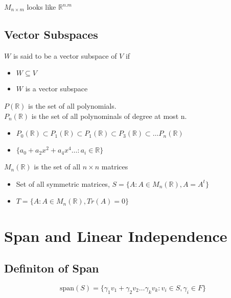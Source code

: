 \documentclass[11pt,a4paper]{colorart}
\def\l{\left}
\def\r{\right}
\def\R{\mathbb{R}}
\def\g{\gamma}
\begin{document}
$M_{n\times m}$ looks like $\R^{n.m}$

\subsection{Vector Subspaces}

\begin{definition}
	$W$ is said to be a vector subspace of $V$ if 
	\begin{itemize}
		\item $ W \subseteq V$
		\item $W$ is a vector subspace
	\end{itemize}
\end{definition}

\begin{example}
	$P\l(\R\r)$ is the set of all polynomials.\\
	$P_n\l(\R\r)$ is the set of all polynominals of degree at most n.
	\begin{itemize}
		\item $ P_0\l(\R\r) \subset P_1\l(\R\r) \subset P_1\l(\R\r) \subset P_3\l(\R\r) \subset \dots P_n\l(\R\r) $
		\item $\{a_0 + a_2 x^2 + a_4 x^4 \dots : a_i \in \R\} $
	\end{itemize}
\end{example}

\begin{example}
	$M_n\l(\R\r)$ is the set of all $n\times n$ matrices \\
	\begin{itemize}
		\item Set of all symmetric matrices, $ S = \{ A : A \in M_n\l(\R\r), A = A^t \} $
		\item $ T = \{ A : A \in M_n\l(\R\r), Tr\l(A\r)=0\} $
	\end{itemize}
\end{example}

\section{Span and Linear Independence}

\subsection{Definiton of Span}

\begin{definition}[Span]
	\[ \text{span}\l(S\r) = \{ \g_1 v_1 + \g_2 v_2 \dots \g_k v_k : v_i\in S, \g_i \in F \} \]
\end{definition}
\end{document}
